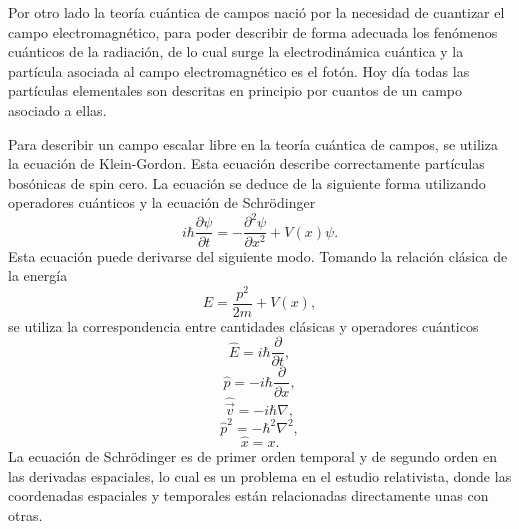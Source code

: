 \documentclass[a4paper,openright,12pt]{book}
\begin{document}
Por otro lado la teoría cuántica de campos nació por la necesidad de cuantizar el campo electromagnético, para poder describir de forma adecuada los fenómenos cuánticos de la radiación, de lo cual surge la electrodinámica cuántica y la partícula asociada al campo electromagnético es el fotón. Hoy día todas las partículas elementales son descritas en principio por cuantos de un campo asociado a ellas.

Para describir un campo escalar libre en la teoría cuántica de campos, se utiliza la ecuación de Klein-Gordon. Esta ecuación describe correctamente partículas bosónicas de spin cero. La ecuación se deduce de la siguiente forma utilizando operadores cuánticos y la ecuación de Schrödinger
\begin{equation}
i\hbar\frac{\partial \psi}{\partial t} = - \frac{\partial^{2}\psi}{\partial x^{2}}
+ V(x)\psi.\label{eqn 1.46}
\end{equation}
Esta ecuación puede derivarse del siguiente modo. Tomando la relación clásica de la energía
\begin{equation}
E = \frac{p^{2}}{2m} + V(x),\label{eqn 1.47}
\end{equation}
se utiliza la correspondencia entre cantidades clásicas y operadores cuánticos
\begin{equation*}
\hat{E}=i\hbar\frac{\partial}{\partial t},
\end{equation*}
\begin{equation*}
\hat{p} = -i\hbar\frac{\partial}{\partial x},
\end{equation*}
\begin{equation*}
\hat{\vec{v}}= -i\hbar\nabla,
\end{equation*}
\begin{equation*}
\hat{p}^{2}=-\hbar^{2}\nabla^{2},
\end{equation*}
\begin{equation*}
\hat{x}=x.
\end{equation*}
La ecuación de Schrödinger es de primer orden temporal y de segundo orden en las derivadas espaciales, lo cual es un problema en el estudio relativista, donde las coordenadas espaciales y temporales están relacionadas directamente unas con otras.
\end{document}
